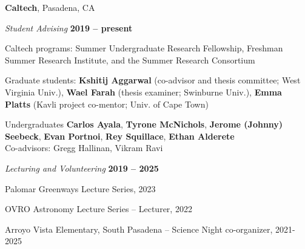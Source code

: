 \documentclass[11pt]{article}
\newcommand{\halfblankline}{\quad\vspace{-0.5\baselineskip}\pagebreak[3]}
\begin{document}
\textbf{Caltech}, Pasadena, CA
\begin{outerlist}
\item[] \textit{Student Advising}
  \hfill \textbf{2019 -- present}
    \begin{innerlist}
      \item Caltech programs: Summer Undergraduate Research Fellowship, Freshman Summer Research Institute, and the Summer Research Consortium
      \item Graduate students: \textbf{Kshitij Aggarwal} (co-advisor and thesis committee; West Virginia Univ.), \textbf{Wael Farah} (thesis examiner; Swinburne Univ.), \textbf{Emma Platts} (Kavli project co-mentor; Univ. of Cape Town)
      \item Undergraduates \textbf{Carlos Ayala}, \textbf{Tyrone McNichols}, \textbf{Jerome (Johnny) Seebeck}, \textbf{Evan Portnoi}, \textbf{Rey Squillace}, \textbf{Ethan Alderete} \\
      Co-advisors: Gregg Hallinan, Vikram Ravi
    \end{innerlist}

\item[] \textit{Lecturing and Volunteering}
    \hfill \textbf{2019 -- 2025}
    \begin{innerlist}
        \item Palomar Greenways Lecture Series, 2023
        \item OVRO Astronomy Lecture Series -- Lecturer, 2022
        \item Arroyo Vista Elementary, South Pasadena -- Science Night co-organizer, 2021-2025
    \end{innerlist}
\end{outerlist}

\halfblankline
\end{document}
